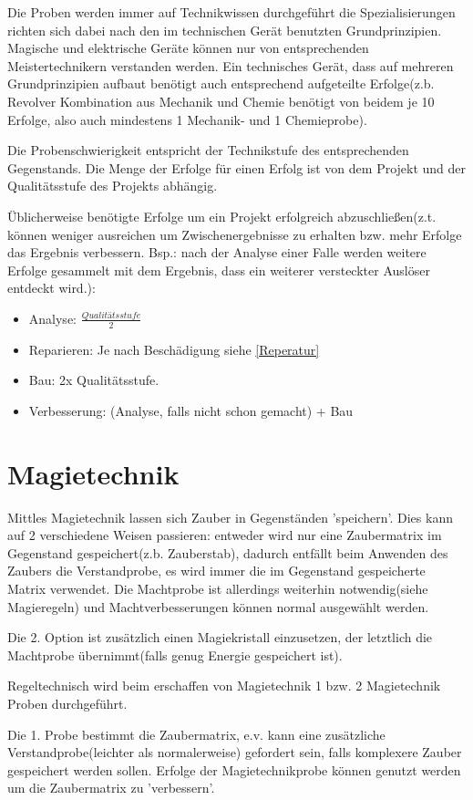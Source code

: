 Die Proben werden immer auf Technikwissen durchgeführt die Spezialisierungen richten sich dabei nach den im technischen Gerät benutzten Grundprinzipien. Magische und elektrische Geräte können nur von entsprechenden Meistertechnikern verstanden werden.
Ein technisches Gerät, dass auf mehreren Grundprinzipien aufbaut benötigt auch entsprechend aufgeteilte Erfolge(z.b. Revolver Kombination aus Mechanik und Chemie benötigt von beidem je 10 Erfolge, also auch mindestens 1 Mechanik- und 1 Chemieprobe).

Die Probenschwierigkeit entspricht der Technikstufe des entsprechenden Gegenstands.
Die Menge der Erfolge für einen Erfolg ist von dem Projekt und der Qualitätsstufe des Projekts abhängig.

Üblicherweise benötigte Erfolge um ein Projekt erfolgreich abzuschließen(z.t. können weniger ausreichen um Zwischenergebnisse zu erhalten bzw. mehr Erfolge das Ergebnis verbessern. Bsp.: nach der Analyse einer Falle werden weitere Erfolge gesammelt mit dem Ergebnis, dass ein weiterer versteckter Auslöser entdeckt wird.):
\begin{itemize}
\item Analyse: $\frac{Qualitätsstufe}{2}$
\item Reparieren: Je nach Beschädigung siehe \ref{Reperatur}
\item Bau: 2x Qualitätsstufe.
\item Verbesserung: (Analyse, falls nicht schon gemacht) + Bau
\end{itemize}

\section{Magietechnik}
Mittles Magietechnik lassen sich Zauber in Gegenständen 'speichern'. Dies kann auf 2 verschiedene Weisen passieren: entweder wird nur eine Zaubermatrix im Gegenstand gespeichert(z.b. Zauberstab), dadurch entfällt beim Anwenden des Zaubers die Verstandprobe, es wird immer die im Gegenstand gespeicherte Matrix verwendet.
Die Machtprobe ist allerdings weiterhin notwendig(siehe Magieregeln) und Machtverbesserungen können normal ausgewählt werden.

Die 2. Option ist zusätzlich einen Magiekristall einzusetzen, der letztlich die Machtprobe übernimmt(falls genug Energie gespeichert ist).

Regeltechnisch wird beim erschaffen von Magietechnik 1 bzw. 2 Magietechnik Proben durchgeführt.

Die 1. Probe bestimmt die Zaubermatrix, e.v. kann eine zusätzliche Verstandprobe(leichter als normalerweise) gefordert sein, falls komplexere Zauber gespeichert werden sollen. Erfolge der Magietechnikprobe können genutzt werden um die Zaubermatrix zu 'verbessern'.


